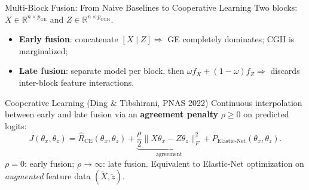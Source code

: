 \documentclass[aspectratio=169, 10pt]{beamer}
\begin{document}
\begin{frame}{Multi-Block Fusion: From Naive Baselines to Cooperative Learning}
  Two blocks: $X \in \mathbb{R}^{n \times p_{\text{GE}}}$ and $Z \in \mathbb{R}^{n \times p_{\text{CGH}}}$.
  \begin{itemize}
    \item \textbf{Early fusion}: concatenate $[X \mid Z] \Rightarrow$ GE completely dominates; CGH is marginalized;
    \item \textbf{Late fusion}: separate model per block, then $\omega f_X + (1-\omega) f_Z \Rightarrow$ discards inter-block feature interactions.
  \end{itemize}

  \begin{block}{Cooperative Learning (Ding \& Tibshirani, PNAS 2022)}
    Continuous interpolation between early and late fusion via an \textbf{agreement penalty} $\rho \ge 0$ on predicted logits:
    \[
      J(\theta_x, \theta_z) = \hat{R}_{\text{CE}}(\theta_x, \theta_z) + \underbrace{\frac{\rho}{2} \|X \theta_x - Z \theta_z\|_F^2}_{\text{agreement}} + P_{\text{Elastic-Net}}(\theta_x, \theta_z).
    \]
    $\rho = 0$: early fusion; $\rho \to \infty$: late fusion. Equivalent to Elastic-Net optimization on \textit{augmented} feature data $(\tilde{X}, \tilde{z})$.
  \end{block}
\end{frame}
\end{document}
